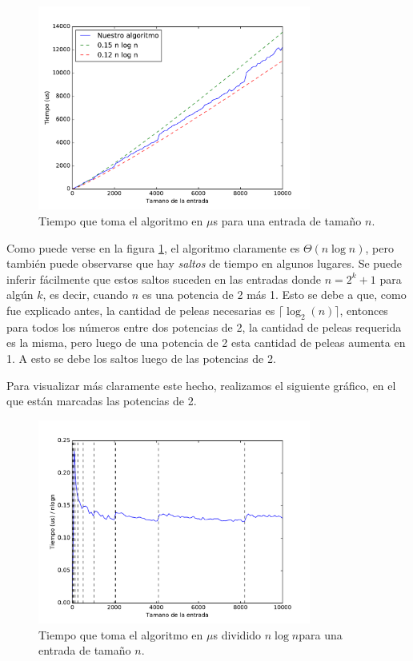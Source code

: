 \begin{figure}[H]
 \centering
	\includegraphics[width=0.8\textwidth]{img/tiempos/kaioken1.pdf}
	\caption{\footnotesize Tiempo que toma el algoritmo en $\mu$s para una entrada de tamaño $n$.}
	\label{fig:kaioken-tiempos1}
\end{figure}

Como puede verse en la figura \ref{fig:kaioken-tiempos1}, el algoritmo claramente es $\Theta(n \log n)$, pero también puede observarse que hay \emph{saltos} de tiempo en algunos lugares.
Se puede inferir fácilmente que estos saltos suceden en las entradas donde $n = 2^k + 1$ para algún $k$, es decir, cuando $n$ es una potencia de 2 más 1.
Esto se debe a que, como fue explicado antes, la cantidad de peleas necesarias es $\lceil \log_2(n) \rceil$, entonces para todos los números entre dos potencias de 2, la cantidad de peleas requerida es la misma, pero luego de una potencia de 2 esta cantidad de peleas aumenta en 1.
A esto se debe los saltos luego de las potencias de 2.

Para visualizar más claramente este hecho, realizamos el siguiente gráfico, en el que están marcadas las potencias de 2.

\begin{figure}[H]
 \centering
	\includegraphics[width=0.8\textwidth]{img/tiempos/kaioken2.pdf}
	\caption{\footnotesize Tiempo que toma el algoritmo en $\mu$s dividido $n\log n$para una entrada de tamaño $n$.}
	\label{fig:kaioken-tiempos2}
\end{figure}

